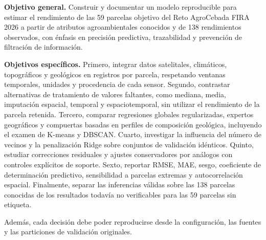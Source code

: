\textbf{Objetivo general.} Construir y documentar un modelo reproducible para estimar el rendimiento de las 59 parcelas objetivo del Reto AgroCebada FIRA 2026 a partir de atributos agroambientales conocidos y de 138 rendimientos observados, con énfasis en precisión predictiva, trazabilidad y prevención de filtración de información.

\textbf{Objetivos específicos.} Primero, integrar datos satelitales, climáticos, topográficos y geológicos en registros por parcela, respetando ventanas temporales, unidades y procedencia de cada sensor. Segundo, contrastar alternativas de tratamiento de valores faltantes, como mediana, media, imputación espacial, temporal y espaciotemporal, sin utilizar el rendimiento de la parcela retenida. Tercero, comparar regresiones globales regularizadas, expertos geográficos y compuertas basadas en perfiles de composición geológica, incluyendo el examen de K-means y DBSCAN. Cuarto, investigar la influencia del número de vecinos y la penalización Ridge sobre conjuntos de validación idénticos. Quinto, estudiar correcciones residuales y ajustes conservadores por análogos con controles explícitos de soporte. Sexto, reportar RMSE, MAE, sesgo, coeficiente de determinación predictivo, sensibilidad a parcelas extremas y autocorrelación espacial. Finalmente, separar las inferencias válidas sobre las 138 parcelas conocidas de los resultados todavía no verificables para las 59 parcelas sin etiqueta.

Además, cada decisión debe poder reproducirse desde la configuración, las fuentes y las particiones de validación originales.
